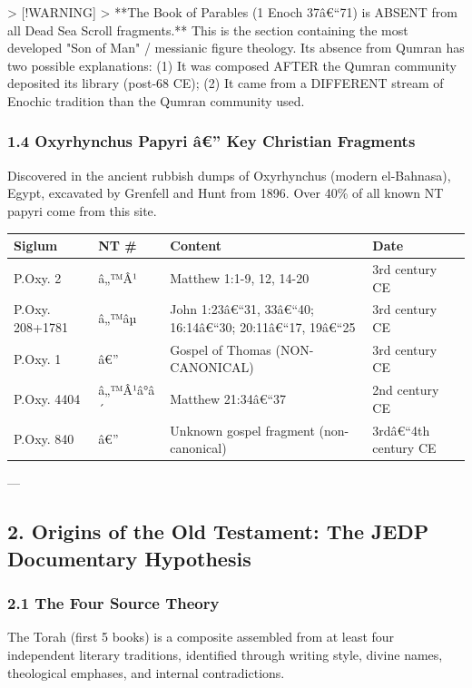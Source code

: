 \documentclass[aps,prd,11pt,onecolumn,superscriptaddress,nofootinbib,floatfix]{revtex4-2}
\begin{document}
> [!WARNING]
> **The Book of Parables (1 Enoch 37â€``71) is ABSENT from all Dead Sea Scroll fragments.** This is the section containing the most developed "Son of Man" / messianic figure theology. Its absence from Qumran has two possible explanations: (1) It was composed AFTER the Qumran community deposited its library (post-68 CE); (2) It came from a DIFFERENT stream of Enochic tradition than the Qumran community used.


\subsubsection{1.4 Oxyrhynchus Papyri â€'' Key Christian Fragments}


Discovered in the ancient rubbish dumps of Oxyrhynchus (modern el-Bahnasa), Egypt, excavated by Grenfell and Hunt from 1896. Over 40\% of all known NT papyri come from this site.


\begin{table}[h!]
\centering
\begin{tabular}{p{3cm}p{3cm}p{3cm}p{3cm}}
\hline
Siglum & NT \# & Content & Date \\
\hline
P.Oxy. 2 & â„™Â¹ & Matthew 1:1-9, 12, 14-20 & 3rd century CE \\
P.Oxy. 208+1781 & â„™âµ & John 1:23â€``31, 33â€``40; 16:14â€``30; 20:11â€``17, 19â€``25 & 3rd century CE \\
P.Oxy. 1 & â€'' & Gospel of Thomas (NON-CANONICAL) & 3rd century CE \\
P.Oxy. 4404 & â„™Â¹â°â´ & Matthew 21:34â€``37 & 2nd century CE \\
P.Oxy. 840 & â€'' & Unknown gospel fragment (non-canonical) & 3rdâ€``4th century CE \\
\hline
\end{tabular}
\end{table}



---


\subsection{2. Origins of the Old Testament: The JEDP Documentary Hypothesis}


\subsubsection{2.1 The Four Source Theory}


The Torah (first 5 books) is a composite assembled from at least four independent literary traditions, identified through writing style, divine names, theological emphases, and internal contradictions.
\end{document}
